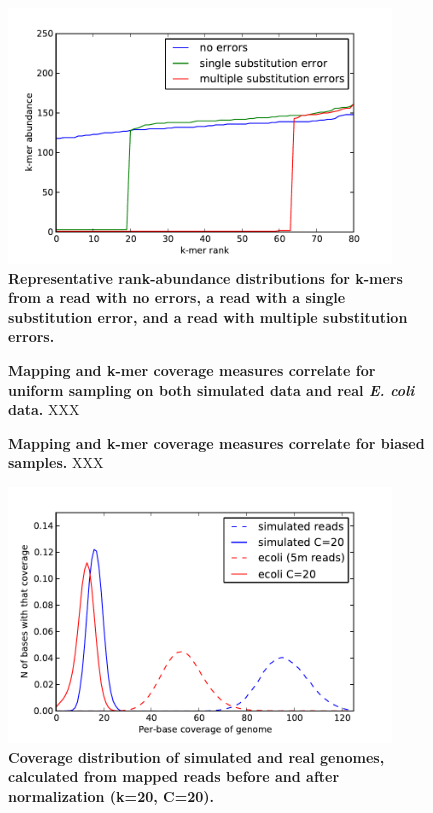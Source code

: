 \documentclass[10pt]{article}
\begin{document}
\begin{figure}
\includegraphics[width=4in]{diginorm-ranks.pdf}
\caption{
{\bf Representative rank-abundance distributions for k-mers from a read with no errors,
a read with a single substitution error, and a read with multiple
substitution errors.}}
\label{fig:rankabund}
\end{figure}

\begin{figure}[!ht]
\begin{center}
\end{center}
\caption{
{\bf Mapping and k-mer coverage measures correlate for uniform sampling on
both simulated data and real {\em E. coli} data.}
XXX
}
\label{fig:random}
\end{figure}


\begin{figure}[!ht]
\begin{center}
\end{center}
\caption{
{\bf Mapping and k-mer coverage measures correlate for biased samples.}
XXX
}
\label{fig:transcripts}
\end{figure}

\begin{figure}
\includegraphics[width=4in]{diginorm-coverage.pdf}
\caption{
{\bf Coverage distribution of simulated and real genomes, calculated from mapped reads before and after normalization (k=20, C=20).}}
\label{fig:coverage}
\end{figure}
\end{document}
